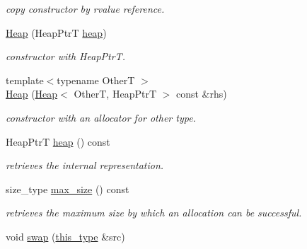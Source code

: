 \begin{DoxyCompactItemize}
\begin{DoxyCompactList}\small\item\em copy constructor by rvalue reference. \end{DoxyCompactList}\item 
\hypertarget{classhryky_1_1allocator_1_1_heap_ace223f3243a7e5a396cf7b86f5dcfd0f}{\hyperlink{classhryky_1_1allocator_1_1_heap_ace223f3243a7e5a396cf7b86f5dcfd0f}{Heap} (Heap\-Ptr\-T \hyperlink{classhryky_1_1allocator_1_1_heap_a8e298fe26a676998b9bc5178c79961dc}{heap})}\label{classhryky_1_1allocator_1_1_heap_ace223f3243a7e5a396cf7b86f5dcfd0f}

\begin{DoxyCompactList}\small\item\em constructor with Heap\-Ptr\-T. \end{DoxyCompactList}\item 
\hypertarget{classhryky_1_1allocator_1_1_heap_a73751d2de2bd8ca6a88d7a3c5d2327dd}{{\footnotesize template$<$typename Other\-T $>$ }\\\hyperlink{classhryky_1_1allocator_1_1_heap_a73751d2de2bd8ca6a88d7a3c5d2327dd}{Heap} (\hyperlink{classhryky_1_1allocator_1_1_heap}{Heap}$<$ Other\-T, Heap\-Ptr\-T $>$ const \&rhs)}\label{classhryky_1_1allocator_1_1_heap_a73751d2de2bd8ca6a88d7a3c5d2327dd}

\begin{DoxyCompactList}\small\item\em constructor with an allocator for other type. \end{DoxyCompactList}\item 
\hypertarget{classhryky_1_1allocator_1_1_heap_a8e298fe26a676998b9bc5178c79961dc}{Heap\-Ptr\-T \hyperlink{classhryky_1_1allocator_1_1_heap_a8e298fe26a676998b9bc5178c79961dc}{heap} () const }\label{classhryky_1_1allocator_1_1_heap_a8e298fe26a676998b9bc5178c79961dc}

\begin{DoxyCompactList}\small\item\em retrieves the internal representation. \end{DoxyCompactList}\item 
\hypertarget{classhryky_1_1allocator_1_1_heap_a6e2a6c2d9a4d9542059b28fca4c4a2d6}{size\-\_\-type \hyperlink{classhryky_1_1allocator_1_1_heap_a6e2a6c2d9a4d9542059b28fca4c4a2d6}{max\-\_\-size} () const }\label{classhryky_1_1allocator_1_1_heap_a6e2a6c2d9a4d9542059b28fca4c4a2d6}

\begin{DoxyCompactList}\small\item\em retrieves the maximum size by which an allocation can be successful. \end{DoxyCompactList}\item 
\hypertarget{classhryky_1_1allocator_1_1_heap_a855528bfa428ad5289cbdff073311d68}{void \hyperlink{classhryky_1_1allocator_1_1_heap_a855528bfa428ad5289cbdff073311d68}{swap} (\hyperlink{classhryky_1_1allocator_1_1_base}{this\-\_\-type} \&src)}\label{classhryky_1_1allocator_1_1_heap_a855528bfa428ad5289cbdff073311d68}


\end{DoxyCompactItemize}
